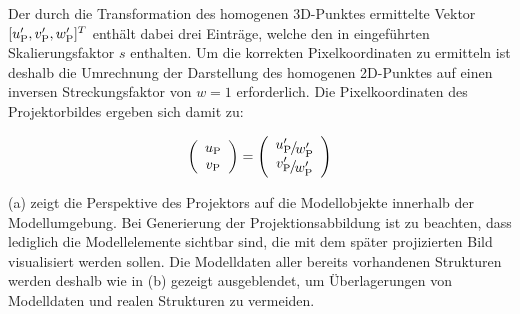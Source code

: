
Der durch die Transformation des homogenen 3D-Punktes ermittelte Vektor $[u_{{\mathrm{P}}}',v_{{\mathrm{P}}}',w_{{\mathrm{P}}}']^T$ enthält dabei drei Einträge, welche den in  eingeführten Skalierungsfaktor $s$ enthalten. Um die korrekten Pixelkoordinaten zu ermitteln ist deshalb die Umrechnung der Darstellung des homogenen 2D-Punktes auf einen inversen Streckungsfaktor von $w=1$ erforderlich. Die Pixelkoordinaten des Projektorbildes ergeben sich damit zu:

\begin{equation}
\left(\begin{array}{c}
u_{\ind{P}}\\
v_{\ind{P}}
\end{array}\right)
=
\left(\begin{array}{c}
\nicefrac{u_{\ind{P}}'}{w_{\ind{P}}'}\\
\nicefrac{v_{\ind{P}}'}{w_{\ind{P}}'}
\end{array}\right)
\end{equation}

 (a) zeigt die Perspektive des Projektors auf die Modellobjekte innerhalb der Modellumgebung. Bei Generierung der Projektionsabbildung ist zu beachten, dass lediglich die Modellelemente sichtbar sind, die mit dem später projizierten Bild visualisiert werden sollen. Die Modelldaten aller bereits vorhandenen Strukturen werden deshalb wie in  (b) gezeigt ausgeblendet, um Überlagerungen von Modelldaten und realen Strukturen zu vermeiden.

\prever{
}


